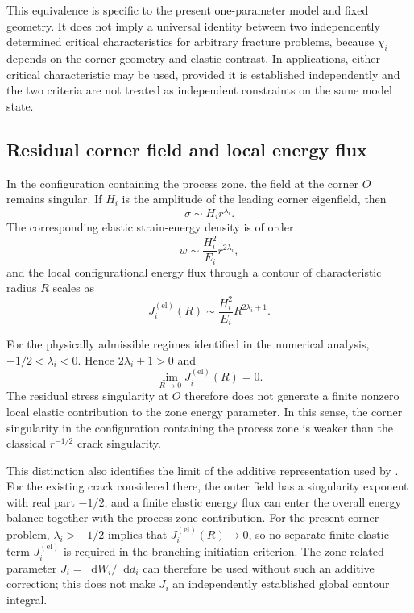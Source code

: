 \documentclass[pdflatex,iicol,sn-mathphys-ay]{sn-jnl}
\newcommand{\dd}{\mathop{}\!\mathrm{d}}
\begin{document}
This equivalence is specific to the present one-parameter model and fixed
geometry. It does not imply a universal identity between two independently
determined critical characteristics for arbitrary fracture problems, because
$\chi_i$ depends on the corner geometry and elastic contrast. In
applications, either critical characteristic may be used, provided it is
established independently and the two criteria are not treated as
independent constraints on the same model state.

\subsection{Residual corner field and local energy flux}
\label{subsec:discussion-flux}

In the configuration containing the process zone, the field at the corner
$O$ remains singular. If $H_i$ is the amplitude of the leading corner
eigenfield, then
\begin{equation*}
  \sigma\sim H_i r^{\lambda_i}.
\end{equation*}
The corresponding elastic strain-energy density is of order
\begin{equation*}
  w\sim\frac{H_i^2}{E_i}r^{2\lambda_i},
\end{equation*}
and the local configurational energy flux through a contour of
characteristic radius $R$ scales as
\begin{equation}
\label{eq:local-elastic-flux-scaling}
  J_i^{(\mathrm{el})}(R)
  \sim\frac{H_i^2}{E_i}R^{2\lambda_i+1}.
\end{equation}

For the physically admissible regimes identified in the numerical
analysis, $-1/2<\lambda_i<0$. Hence $2\lambda_i+1>0$ and
\begin{equation*}
  \lim_{R\to0}J_i^{(\mathrm{el})}(R)=0.
\end{equation*}
The residual stress singularity at $O$ therefore does not generate a
finite nonzero local elastic contribution to the zone energy parameter.
In this sense, the corner singularity in the configuration containing the
process zone is weaker than the classical $r^{-1/2}$ crack singularity.

This distinction also identifies the limit of the additive representation
used by \citet{KaminskyDudyk2026Criteria}. For the
existing crack considered there, the outer field has a singularity exponent
with real part $-1/2$, and a finite elastic energy flux can enter the overall energy
balance together with the process-zone contribution. For the present
corner problem, $\lambda_i>-1/2$ implies that
$J_i^{(\mathrm{el})}(R)\to0$, so no separate finite elastic term
$J_i^{(\mathrm{el})}$ is required in the branching-initiation criterion. The zone-related parameter
$J_i=\dd W_i/\dd d_i$ can therefore be used without such an additive
correction; this does not make $J_i$ an independently established global
contour integral.
\end{document}
